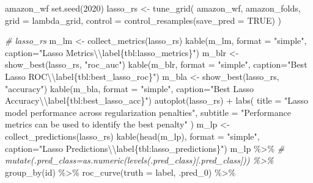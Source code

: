 \documentclass[
]{article}
\newenvironment{Shaded}{}{}
\newcommand{\AttributeTok}[1]{\textcolor[rgb]{0.49,0.56,0.16}{#1}}
\newcommand{\CommentTok}[1]{\textcolor[rgb]{0.38,0.63,0.69}{\textit{#1}}}
\newcommand{\ConstantTok}[1]{\textcolor[rgb]{0.53,0.00,0.00}{#1}}
\newcommand{\DecValTok}[1]{\textcolor[rgb]{0.25,0.63,0.44}{#1}}
\newcommand{\FunctionTok}[1]{\textcolor[rgb]{0.02,0.16,0.49}{#1}}
\newcommand{\NormalTok}[1]{#1}
\newcommand{\OtherTok}[1]{\textcolor[rgb]{0.00,0.44,0.13}{#1}}
\newcommand{\SpecialCharTok}[1]{\textcolor[rgb]{0.25,0.44,0.63}{#1}}
\newcommand{\StringTok}[1]{\textcolor[rgb]{0.25,0.44,0.63}{#1}}
\begin{document}
\begin{Shaded}
\begin{Highlighting}[]
\NormalTok{amazon\_wf}
\FunctionTok{set.seed}\NormalTok{(}\DecValTok{2020}\NormalTok{)}
\NormalTok{lasso\_rs }\OtherTok{\textless{}{-}} \FunctionTok{tune\_grid}\NormalTok{(}
\NormalTok{  amazon\_wf,}
\NormalTok{  amazon\_folds,}
  \AttributeTok{grid =}\NormalTok{ lambda\_grid,}
  \AttributeTok{control =} \FunctionTok{control\_resamples}\NormalTok{(}\AttributeTok{save\_pred =} \ConstantTok{TRUE}\NormalTok{)}
\NormalTok{)}

\CommentTok{\# lasso\_rs}
\NormalTok{m\_lm }\OtherTok{\textless{}{-}} \FunctionTok{collect\_metrics}\NormalTok{(lasso\_rs)}
\FunctionTok{kable}\NormalTok{(m\_lm, }\AttributeTok{format =} \StringTok{"simple"}\NormalTok{, }\AttributeTok{caption=}\StringTok{"Lasso Metrics}\SpecialCharTok{\textbackslash{}\textbackslash{}}\StringTok{label\{tbl:lasso\_metrics\}"}\NormalTok{)}
\NormalTok{m\_blr }\OtherTok{\textless{}{-}} \FunctionTok{show\_best}\NormalTok{(lasso\_rs, }\StringTok{"roc\_auc"}\NormalTok{)}
\FunctionTok{kable}\NormalTok{(m\_blr, }\AttributeTok{format =} \StringTok{"simple"}\NormalTok{, }\AttributeTok{caption=}\StringTok{"Best Lasso ROC}\SpecialCharTok{\textbackslash{}\textbackslash{}}\StringTok{label\{tbl:best\_lasso\_roc\}"}\NormalTok{)}
\NormalTok{m\_bla }\OtherTok{\textless{}{-}} \FunctionTok{show\_best}\NormalTok{(lasso\_rs, }\StringTok{"accuracy"}\NormalTok{)}
\FunctionTok{kable}\NormalTok{(m\_bla, }\AttributeTok{format =} \StringTok{"simple"}\NormalTok{, }\AttributeTok{caption=}\StringTok{"Best Lasso Accuracy}\SpecialCharTok{\textbackslash{}\textbackslash{}}\StringTok{label\{tbl:best\_lasso\_acc\}"}\NormalTok{)}
\FunctionTok{autoplot}\NormalTok{(lasso\_rs) }\SpecialCharTok{+}
  \FunctionTok{labs}\NormalTok{(}
    \AttributeTok{title =} \StringTok{"Lasso model performance across regularization penalties"}\NormalTok{,}
    \AttributeTok{subtitle =} \StringTok{"Performance metrics can be used to identify the best penalty"}
\NormalTok{  )}
\NormalTok{m\_lp }\OtherTok{\textless{}{-}} \FunctionTok{collect\_predictions}\NormalTok{(lasso\_rs)}
\FunctionTok{kable}\NormalTok{(}\FunctionTok{head}\NormalTok{(m\_lp), }\AttributeTok{format =} \StringTok{"simple"}\NormalTok{, }\AttributeTok{caption=}\StringTok{"Lasso Predictions}\SpecialCharTok{\textbackslash{}\textbackslash{}}\StringTok{label\{tbl:lasso\_predictions\}"}\NormalTok{)}
\NormalTok{m\_lp }\SpecialCharTok{\%\textgreater{}\%}
  \CommentTok{\# mutate(.pred\_class=as.numeric(levels(.pred\_class)[.pred\_class])) \%\textgreater{}\%}
  \FunctionTok{group\_by}\NormalTok{(id) }\SpecialCharTok{\%\textgreater{}\%}
  \FunctionTok{roc\_curve}\NormalTok{(}\AttributeTok{truth =}\NormalTok{ label, .pred\_0) }\SpecialCharTok{\%\textgreater{}\%}

\end{Highlighting}
\end{Shaded}
\end{document}
